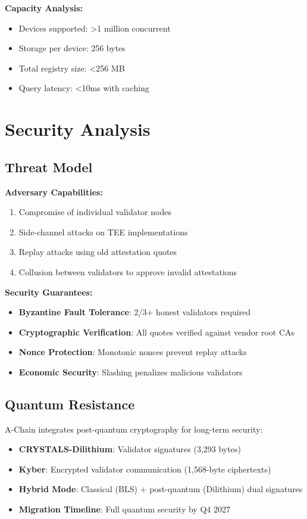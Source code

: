 \documentclass[11pt,a4paper]{article}
\begin{document}
\textbf{Capacity Analysis:}
\begin{itemize}
\item Devices supported: >1 million concurrent
\item Storage per device: 256 bytes
\item Total registry size: <256 MB
\item Query latency: <10ms with caching
\end{itemize}

\section{Security Analysis}

\subsection{Threat Model}

\textbf{Adversary Capabilities:}
\begin{enumerate}
\item Compromise of individual validator nodes
\item Side-channel attacks on TEE implementations
\item Replay attacks using old attestation quotes
\item Collusion between validators to approve invalid attestations
\end{enumerate}

\textbf{Security Guarantees:}
\begin{itemize}
\item \textbf{Byzantine Fault Tolerance}: 2/3+ honest validators required
\item \textbf{Cryptographic Verification}: All quotes verified against vendor root CAs
\item \textbf{Nonce Protection}: Monotonic nonces prevent replay attacks
\item \textbf{Economic Security}: Slashing penalizes malicious validators
\end{itemize}

\subsection{Quantum Resistance}

A-Chain integrates post-quantum cryptography for long-term security:

\begin{itemize}
\item \textbf{CRYSTALS-Dilithium}: Validator signatures (3,293 bytes)
\item \textbf{Kyber}: Encrypted validator communication (1,568-byte ciphertexts)
\item \textbf{Hybrid Mode}: Classical (BLS) + post-quantum (Dilithium) dual signatures
\item \textbf{Migration Timeline}: Full quantum security by Q4 2027
\end{itemize}
\end{document}
